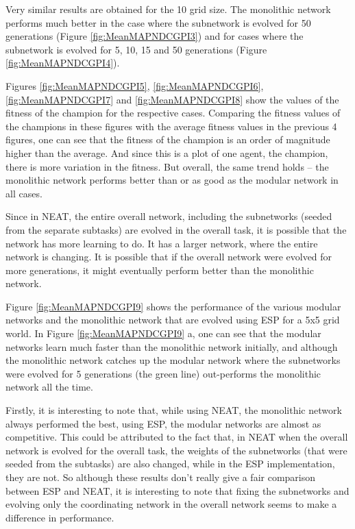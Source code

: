 Very similar results are obtained for the 10  grid size. The monolithic network performs much better in the case where the subnetwork is evolved for 50 generations (Figure \ref{fig:MeanMAPNDCGPI3}) and for cases where the subnetwork is evolved for 5, 10, 15 and 50 generations (Figure \ref{fig:MeanMAPNDCGPI4}).

Figures \ref{fig:MeanMAPNDCGPI5}, \ref{fig:MeanMAPNDCGPI6}, \ref{fig:MeanMAPNDCGPI7} and \ref{fig:MeanMAPNDCGPI8} show the values of the fitness of the champion for the respective cases. Comparing the fitness values of the champions in these figures with the average fitness values in the previous 4 figures, one can see that the fitness of the champion is an order of magnitude higher than the average. And since this is a plot of one agent, the champion, there is more variation in the fitness. But overall, the same trend holds -- the monolithic network performs better than or as good as the modular network in all cases. 

Since in NEAT, the entire overall network, including the subnetworks (seeded from the separate subtasks) are evolved in the overall task, it is possible that the network has more learning to do. It has a larger network, where the entire network is changing. It is possible that if the overall network were evolved for more generations, it might eventually perform better than the monolithic network.

Figure \ref{fig:MeanMAPNDCGPI9} shows the performance of the various modular networks and the monolithic network that are evolved using ESP for a 5x5 grid world. In Figure \ref{fig:MeanMAPNDCGPI9} a, one can see that the modular networks learn much faster than the monolithic network initially, and although the monolithic network catches up the modular network where the subnetworks were evolved for 5 generations (the green line) out-performs the monolithic network all the time. 

Firstly, it is interesting to note that, while using NEAT, the monolithic network always performed the best, using ESP, the modular networks are almost as competitive. This could be attributed to the fact that, in NEAT when the overall network is evolved for the overall task, the weights of the subnetworks (that were seeded from the subtasks) are also changed, while in the ESP implementation, they are not. So although these results don't really give a fair comparison  between ESP and NEAT, it is interesting to note that fixing the subnetworks and evolving only the coordinating network in the overall network seems to make a difference in performance. 

